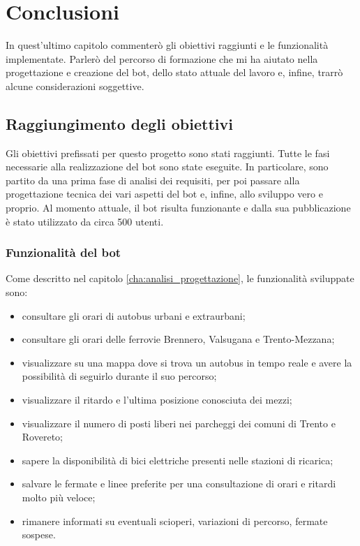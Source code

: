 \chapter{Conclusioni}
\label{cha:conclusioni}

In quest'ultimo capitolo commenterò gli obiettivi raggiunti e le funzionalità implementate. Parlerò del percorso di formazione che mi ha aiutato nella progettazione e creazione del bot, dello stato attuale del lavoro e, infine, trarrò alcune considerazioni soggettive. 

\section{Raggiungimento degli obiettivi}

Gli obiettivi prefissati per questo progetto sono stati raggiunti. Tutte le fasi necessarie alla realizzazione del bot sono state eseguite. In particolare, sono partito da una prima fase di analisi dei requisiti, per poi passare alla progettazione tecnica dei vari aspetti del bot e, infine, allo sviluppo vero e proprio. Al momento attuale, il bot risulta funzionante e dalla sua pubblicazione è stato utilizzato da circa 500 utenti. 

\subsection{Funzionalità del bot}

Come descritto nel capitolo \ref{cha:analisi_progettazione}, le funzionalità sviluppate sono: 
\begin{itemize}
\item consultare gli orari di autobus urbani e extraurbani;
\item consultare gli orari delle ferrovie Brennero, Valsugana e Trento-Mezzana;
\item visualizzare su una mappa dove si trova un autobus in tempo reale e avere la possibilità di seguirlo durante il suo percorso;
\item visualizzare il ritardo e l'ultima posizione conosciuta dei mezzi;
\item visualizzare il numero di posti liberi nei parcheggi dei comuni di Trento e Rovereto;
\item sapere la disponibilità di bici elettriche presenti nelle stazioni di ricarica;
\item salvare le fermate e linee preferite per una consultazione di orari e ritardi molto più veloce;
\item rimanere informati su eventuali scioperi, variazioni di percorso, fermate sospese.
\end{itemize}

